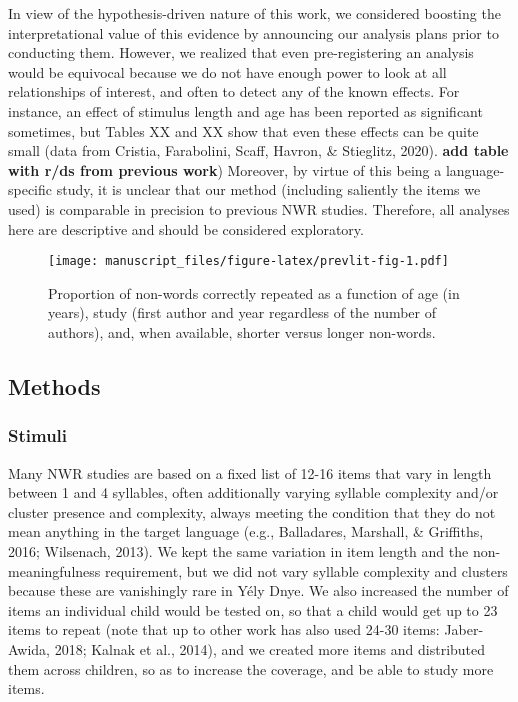 \documentclass[english,,man]{apa6}
\begin{document}
In view of the hypothesis-driven nature of this work, we considered boosting the interpretational value of this evidence by announcing our analysis plans prior to conducting them. However, we realized that even pre-registering an analysis would be equivocal because we do not have enough power to look at all relationships of interest, and often to detect any of the known effects. For instance, an effect of stimulus length and age has been reported as significant sometimes, but Tables XX and XX show that even these effects can be quite small (data from Cristia, Farabolini, Scaff, Havron, \& Stieglitz, 2020). \textbf{add table with r/ds from previous work})
Moreover, by virtue of this being a language-specific study, it is unclear that our method (including saliently the items we used) is comparable in precision to previous NWR studies. Therefore, all analyses here are descriptive and should be considered exploratory.

\begin{figure}
\centering
\texttt{[image: manuscript\_files/figure-latex/prevlit-fig-1.pdf]}
\caption{\label{fig:prevlit-fig}Proportion of non-words correctly repeated as a function of age (in years), study (first author and year regardless of the number of authors), and, when available, shorter versus longer non-words.}
\end{figure}

\hypertarget{methods}{%
\subsection{Methods}\label{methods}}

\hypertarget{stimuli}{%
\subsubsection{Stimuli}\label{stimuli}}

Many NWR studies are based on a fixed list of 12-16 items that vary in length between 1 and 4 syllables, often additionally varying syllable complexity and/or cluster presence and complexity, always meeting the condition that they do not mean anything in the target language (e.g., Balladares, Marshall, \& Griffiths, 2016; Wilsenach, 2013). We kept the same variation in item length and the non-meaningfulness requirement, but we did not vary syllable complexity and clusters because these are vanishingly rare in Yély Dnye. We also increased the number of items an individual child would be tested on, so that a child would get up to 23 items to repeat (note that up to other work has also used 24-30 items: Jaber-Awida, 2018; Kalnak et al., 2014), and we created more items and distributed them across children, so as to increase the coverage, and be able to study more items.
\end{document}
